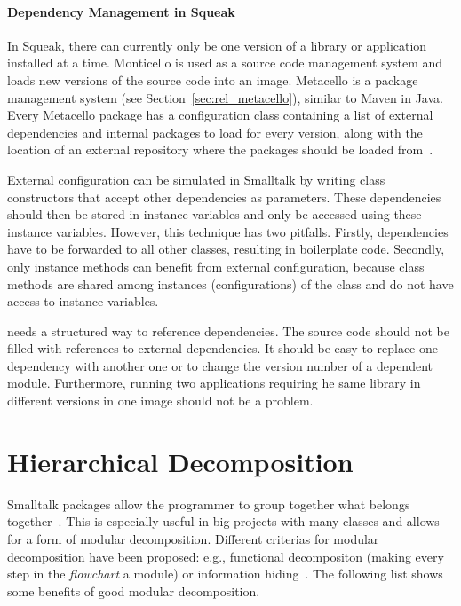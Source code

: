 \paragraph{Dependency Management in Squeak}
In Squeak, there can currently only be one version of a library or application installed at a time. Monticello is used as a source code management system and loads new versions of the source code into an image. Metacello is a package management system (see Section~\ref{sec:rel_metacello}), similar to Maven in Java. Every Metacello package has a configuration class containing a list of external dependencies and internal packages to load for every version, along with the location of an external repository where the packages should be loaded from~\cite{metacellodraft}.

External configuration can be simulated in Smalltalk by writing class constructors that accept other dependencies as parameters. These dependencies should then be stored in instance variables and only be accessed using these instance variables. However, this technique has two pitfalls. Firstly, dependencies have to be forwarded to all other classes, resulting in boilerplate code. Secondly, only instance methods can benefit from external configuration, because class methods are shared among instances (configurations) of the class and do not have access to instance variables.

\msname needs a structured way to reference dependencies. The source code should not be filled with references to external dependencies. It should be easy to replace one dependency with another one or to change the version number of a dependent module. Furthermore, running two applications requiring he same library in different versions in one image should not be a problem.

\section{Hierarchical Decomposition}
\label{sec:problem_hier_decomp}
Smalltalk packages allow the programmer to group together what belongs together~\cite{Eckel:2002:TJ:579108}. This is especially useful in big projects with many classes and allows for a form of modular decomposition. Different criterias for modular decomposition have been proposed: e.g., functional decompositon (making every step in the \emph{flowchart} a module) or information hiding~\cite{Parnas:1972:CUD:361598.361623, Parnas:1984:MSC:800054.801999}. The following list shows some benefits of good modular decomposition.

